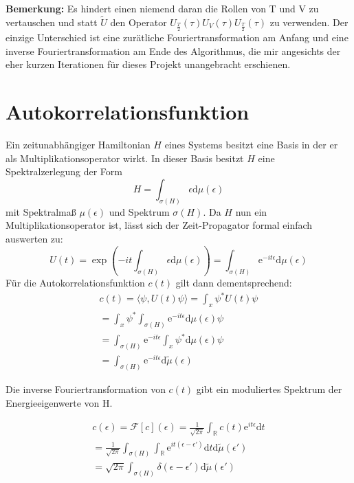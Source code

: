 \documentclass[10pt,a4paper,german]{scrartcl}
\begin{document}
		\textbf{Bemerkung:} Es hindert einen niemend daran die Rollen von T und V zu
		vertauschen	und statt $\tilde{U}$ den Operator 
		$U_{\frac{T}{2}}(\tau) U_V(\tau) U_{\frac{T}{2}}(\tau)$ zu verwenden. Der einzige
		Unterschied ist eine zurätliche Fouriertransformation am Anfang und eine 
		inverse Fouriertransformation am Ende des Algorithmus, die mir angesichts der 
		eher kurzen Iterationen für dieses Projekt unangebracht erschienen.

		
  \section{Autokorrelationsfunktion}
		Ein zeitunabhängiger Hamiltonian $H$ eines Systems besitzt eine Basis in der er als 
		Multiplikationsoperator wirkt. In dieser Basis besitzt $H$ eine Spektralzerlegung
		der Form 
		\begin{equation*}
			H = \int_{\sigma(H)}{\epsilon \mathrm{d}\mu(\epsilon)}
		\end{equation*}
		mit Spektralmaß $\mu(\epsilon)$ und Spektrum $\sigma(H)$.
		Da $H$ nun ein Multiplikationsoperator ist, lässt sich der
		Zeit-Propagator formal einfach auswerten zu:
		\begin{equation*}
			U(t)=\exp\left(
				-i t \int_{\sigma(H)}{\epsilon \mathrm{d}\mu(\epsilon)}
			\right)
			=\int_{\sigma(H)}{\mathrm{e}^{-i t \epsilon} \mathrm{d}\mu(\epsilon)}
		\end{equation*}
		Für die Autokorrelationsfunktion $c(t)$
		gilt dann dementsprechend:
		\begin{multline}
			\label{eq:corr}
			c(t) = \langle \psi,U(t) \psi\rangle
					 = \int_{x} \psi^{*} U(t) \psi \\
					 = \int_{x} \psi^{*}
					 	  \int_{\sigma(H)}{\mathrm{e}^{-i t \epsilon}
					 	 	   \mathrm{d}\mu(\epsilon)} \psi \\
					 = \int_{\sigma(H)}{
					 			\mathrm{e}^{-i t \epsilon}
					 			\int_{x} \psi^{*}
					 	 	   \mathrm{d}\mu(\epsilon)} \psi \\
					 = \int_{\sigma(H)}{
					 			\mathrm{e}^{-i t \epsilon}
					 			\mathrm{d} \tilde{\mu}(\epsilon)}
		\end{multline}
		
		Die inverse Fouriertransformation von $c(t)$ gibt ein moduliertes Spektrum
		der Energieeigenwerte von H.
		
		\begin{multline}
			\label{eq:corrft}
			c(\epsilon) = \mathcal{F}[c](\epsilon) 
			      = \frac{1}{\sqrt{2 \pi}}
			     		\int_{\mathbb{R}} c(t) \mathrm{e}^{it \epsilon} \mathrm{d}t\\
			     = \frac{1}{\sqrt{2 \pi}}
		     			\int_{\sigma(H)}
				     		\int_{\mathbb{R}} \mathrm{e}^{i t (\epsilon -\epsilon')}	\mathrm{d}t
					 		\mathrm{d} \tilde{\mu}(\epsilon')\\
			     = \sqrt{2 \pi}	
			     		\int_{\sigma(H)} \delta(\epsilon -\epsilon')
					 		\mathrm{d} \tilde{\mu}(\epsilon')
		\end{multline}
		
\end{document}
